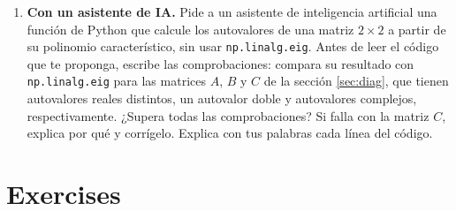 \begin{enumerate}
\item \textbf{Con un asistente de IA.} Pide a un asistente de inteligencia artificial una función de Python que calcule los autovalores de una matriz $2\times 2$ a partir de su polinomio característico, sin usar \texttt{np.linalg.eig}. Antes de leer el código que te proponga, escribe las comprobaciones: compara su resultado con \texttt{np.linalg.eig} para las matrices $A$, $B$ y $C$ de la sección \ref{sec:diag}, que tienen autovalores reales distintos, un autovalor doble y autovalores complejos, respectivamente. ¿Supera todas las comprobaciones? Si falla con la matriz $C$, explica por qué y corrígelo. Explica con tus palabras cada línea del código.
\end{enumerate}

\newpage
\section{Exercises}

